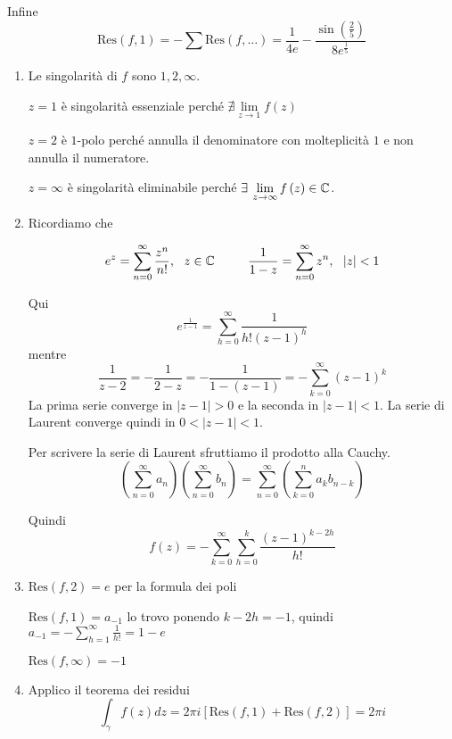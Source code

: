Infine
\begin{equation*}
\mathrm{Res}\left( f,1\right) =-\sum \mathrm{Res}\left( f,\dotsc \right) =\frac{1}{4e} -\frac{\sin\left(\frac{2}{5}\right)}{8e^{\frac{1}{5}}}
\end{equation*}
\Soluzione
\begin{enumerate}
\item Le singolarità di $f$ sono $1,2,\infty $.

$z=1$ è singolarità essenziale perché $\nexists \lim\limits _{z\rightarrow 1} f\left( z\right)$

$z=2$ è $1$-polo perché annulla il denominatore con molteplicità $1$ e non annulla il numeratore.

$z=\infty $ è singolarità eliminabile perché $\exists \lim\limits _{z\rightarrow \infty } f\left( z\right) \in \CC $.
\item Ricordiamo che

\begin{rem}
\begin{equation*}
e^{z} =\sum\limits ^{\infty }_{n=0}\frac{z^{n}}{n!} ,\ \ z\in \mathbb{C}  \ \ \ \ \ \ \ \ \frac{1}{1-z} =\sum\limits ^{\infty }_{n=0} z^{n} ,\ \ \left| z\right| < 1
\end{equation*}
\end{rem}

Qui\begin{equation*}
e^{\frac{1}{z-1}} =\sum\limits ^{\infty }_{h=0}\frac{1}{h!\left( z-1\right)^{h}}
\end{equation*}mentre\begin{equation*}
\frac{1}{z-2} =-\frac{1}{2-z} =-\frac{1}{1-\left( z-1\right)} =-\sum\limits ^{\infty }_{k=0}\left( z-1\right)^{k}
\end{equation*}La prima serie converge in $\left| z-1\right|  >0$ e la seconda in $\left| z-1\right| < 1$. La serie di Laurent converge quindi in $0< \left| z-1\right| < 1$.\begin{rem}
Per scrivere la serie di Laurent sfruttiamo il prodotto alla Cauchy.
\begin{equation*}
\left(\sum\limits ^{\infty }_{n=0} a_{n}\right)\left(\sum\limits ^{\infty }_{n=0} b_{n}\right) =\sum\limits ^{\infty }_{n=0}\left(\sum\limits ^{n}_{k=0} a_{k} b_{n-k}\right)
\end{equation*}
\end{rem}Quindi\begin{equation*}
f\left( z\right) =-\sum\limits ^{\infty }_{k=0}\sum\limits ^{k}_{h=0}\frac{\left( z-1\right)^{k-2h}}{h!}
\end{equation*}
\item $\mathrm{Res}\left( f,2\right) =e$ per la formula dei poli

$\mathrm{Res}\left( f,1\right) =a_{-1}$ lo trovo ponendo $k-2h=-1$, quindi $a_{-1} =-\sum\limits ^{\infty }_{h=1}\frac{1}{h!} =1-e$

$\mathrm{Res}\left( f,\infty \right) =-1$
\item Applico il teorema dei residui\begin{equation*}
\int\nolimits _{\gamma } f\left( z\right) dz=2\pi i\left[\mathrm{Res}\left( f,1\right) +\mathrm{Res}\left( f,2\right)\right] =2\pi i
\end{equation*}
\end{enumerate}
